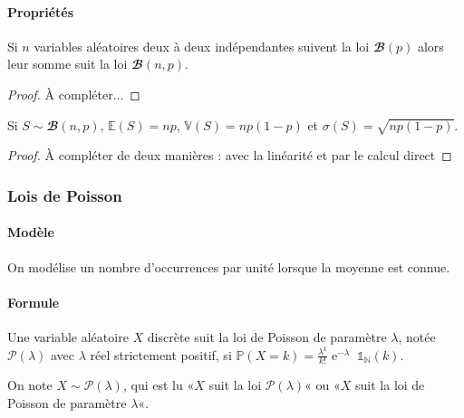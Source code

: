 \paragraph{Propriétés}
\begin{theorem}
Si \(𝑛\) variables aléatoires deux à deux indépendantes suivent la loi \(𝓑(𝑝)\) alors leur somme suit
la loi \(𝓑(𝑛,𝑝)\).
\end{theorem}
\begin{proof}
À compléter...
\end{proof}
\begin{theorem}
\par\noindent
Si \(𝑆∼𝓑(𝑛,𝑝)\), \(𝔼(𝑆)=𝑛𝑝\), \(𝕍(𝑆)=𝑛𝑝(1-𝑝)\) et
\(σ(𝑆)=\sqrt{𝑛𝑝(1-𝑝)}\).
\end{theorem}
\begin{proof}
À compléter de deux manières : avec la linéarité et par le calcul direct
\end{proof}
\subsubsection{Lois de Poisson}
\paragraph{Modèle}
On modélise un nombre d'occurrences par unité lorsque la moyenne est connue.
\paragraph[Formule]{Formule}
\begin{definition}
Une variable aléatoire \(𝑋\) discrète suit la loi de Poisson de paramètre \(𝜆\), notée \(𝒫(𝜆)\) avec
\(𝜆\) réel strictement positif, si \(ℙ(𝑋=𝑘)=\frac{𝜆^{𝑘}}{𝑘!}\operatorname{e}^{-𝜆}\;𝟙_ℕ(𝑘)\).

On note \(𝑋∼𝒫(𝜆)\), qui est lu «\(𝑋\) suit la loi
\(𝒫(𝜆)\)« ou «\(𝑋\) suit la loi de Poisson de paramètre \(𝜆\)«.
\end{definition}
